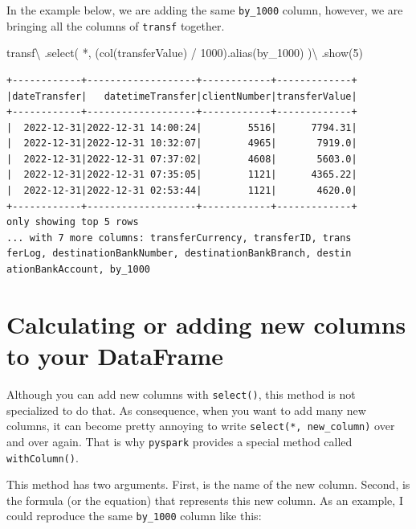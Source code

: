 \documentclass[
  11pt,
  letterpaper,
  DIV=11,
  numbers=noendperiod]{scrreprt}
\newenvironment{Shaded}{\begin{snugshade}}{\end{snugshade}}
\newcommand{\DecValTok}[1]{\textcolor[rgb]{0.68,0.00,0.00}{#1}}
\newcommand{\NormalTok}[1]{\textcolor[rgb]{0.00,0.23,0.31}{#1}}
\newcommand{\OperatorTok}[1]{\textcolor[rgb]{0.37,0.37,0.37}{#1}}
\newcommand{\StringTok}[1]{\textcolor[rgb]{0.13,0.47,0.30}{#1}}
\begin{document}
In the example below, we are adding the same \texttt{by\_1000} column,
however, we are bringing all the columns of \texttt{transf} together.

\begin{Shaded}
\begin{Highlighting}[]
\NormalTok{transf}\OperatorTok{\textbackslash{}}
\NormalTok{  .select(}
    \StringTok{\textquotesingle{}*\textquotesingle{}}\NormalTok{,}
\NormalTok{    (col(}\StringTok{\textquotesingle{}transferValue\textquotesingle{}}\NormalTok{) }\OperatorTok{/} \DecValTok{1000}\NormalTok{).alias(}\StringTok{\textquotesingle{}by\_1000\textquotesingle{}}\NormalTok{)}
\NormalTok{  )}\OperatorTok{\textbackslash{}}
\NormalTok{  .show(}\DecValTok{5}\NormalTok{)}
\end{Highlighting}
\end{Shaded}

\begin{verbatim}
+------------+-------------------+------------+-------------+
|dateTransfer|   datetimeTransfer|clientNumber|transferValue|
+------------+-------------------+------------+-------------+
|  2022-12-31|2022-12-31 14:00:24|        5516|      7794.31|
|  2022-12-31|2022-12-31 10:32:07|        4965|       7919.0|
|  2022-12-31|2022-12-31 07:37:02|        4608|       5603.0|
|  2022-12-31|2022-12-31 07:35:05|        1121|      4365.22|
|  2022-12-31|2022-12-31 02:53:44|        1121|       4620.0|
+------------+-------------------+------------+-------------+
only showing top 5 rows
... with 7 more columns: transferCurrency, transferID, trans
ferLog, destinationBankNumber, destinationBankBranch, destin
ationBankAccount, by_1000
\end{verbatim}

\section{Calculating or adding new columns to your
DataFrame}\label{calculating-or-adding-new-columns-to-your-dataframe}

Although you can add new columns with \texttt{select()}, this method is
not specialized to do that. As consequence, when you want to add many
new columns, it can become pretty annoying to write
\texttt{select(\textquotesingle{}*\textquotesingle{},\ new\_column)}
over and over again. That is why \texttt{pyspark} provides a special
method called \texttt{withColumn()}.

This method has two arguments. First, is the name of the new column.
Second, is the formula (or the equation) that represents this new
column. As an example, I could reproduce the same \texttt{by\_1000}
column like this:
\end{document}
